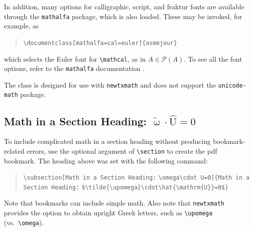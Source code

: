 \documentclass[subscriptcorrection,upint,varvw,barcolor=Goldenrod3,mathalfa=cal=euler,balance,hyphenate,french,pdf-a]{asmejour} %
\begin{document}
In addition, many options for calligraphic, script, and fraktur fonts are available through the \texttt{mathalfa} package, which is also loaded. These may be invoked, for example, as 
\begin{quote}
\verb|\documentclass[mathalfa=cal=euler]{asmejour}| 
\end{quote}
which selects the Euler font for \verb|\mathcal|, as in $A \in \mathcal{P}(A)$. %
To see all the font options, refer to the \texttt{mathalfa} documentation \cite{sharpe2}. 

The class is designed for use with \texttt{newtxmath} and does not support the \texttt{unicode-math} package.

\subsection[Math in a Section Heading: \omega\cdot U=0]{Math in a Section Heading: $\tilde{\upomega}\cdot\hat{\mathrm{U}}=0$}

To include complicated math in a section heading without producing bookmark-related errors, use the optional argument of \verb|\section| to create the pdf bookmark. The heading above was set with the following command:
\begin{quote}\raggedright
\verb|\subsection[Math in a Section Heading:| 
\hspace*{1em}\verb|\omega\cdot U=0]{Math in a Section Heading:|
\hspace*{1em}\verb|$\tilde{\upomega}\cdot\hat{\mathrm{U}}=0$}|
\end{quote}
Note that bookmarks can include simple math. Also note that \texttt{newtxmath} provides the option to obtain upright Greek letters, such as \verb|\upomega| (vs.\ \verb|\omega|).
\end{document}
